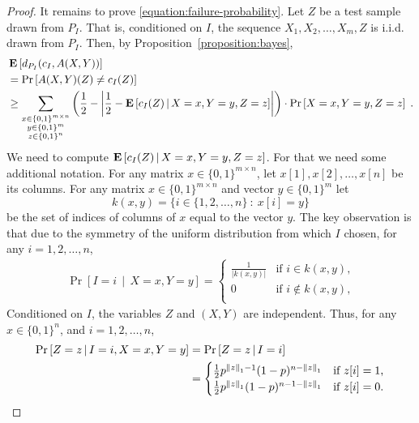 \begin{proof}
It remains to prove \eqref{equation:failure-probability}.
Let $Z$ be a test sample drawn from $P_I$. That is, conditioned on $I$, the sequence $X_1, X_2, \dots, X_m, Z$ is i.i.d. drawn from $P_I$.
Then, by Proposition~\ref{proposition:bayes},
\begin{align}
& \operatorname{\mathbf{E}} \left[d_{P_I}(c_I, A(X,Y))\right] \notag \\
& = \Pr\left[ A(X,Y)(Z) \neq c_I(Z) \right] \notag \\
& \ge \sum_{\substack{x \in \{0,1\}^{m \times n} \\ y \in \{0,1\}^m \\ z \in \{0,1\}^n}} \left( \frac{1}{2} - \left| \frac{1}{2} - \operatorname{\mathbf{E}}\left[ c_I(Z) \, \middle| \, X = x, Y = y, Z = z \right] \right| \right) \cdot \Pr \left[X = x, Y = y, Z = z \right] \label{equation:expected-error-lower-bound} \; .
\end{align}
We need to compute $\operatorname{\mathbf{E}}\left[ c_I(Z) \, \middle| \, X = x, Y = y, Z = z \right]$.
For that we need some additional notation.
For any matrix $x \in \{0,1\}^{m \times n}$, let $x[1], x[2], \dots, x[n]$ be its columns.
For any matrix $x \in \{0,1\}^{m \times n}$ and vector $y \in \{0,1\}^m$ let
$$
k(x,y) = \{ i \in \{1,2,\dots,n\} ~:~ x[i] = y \}
$$
be the set of indices of columns of $x$ equal to the vector $y$. The key
observation is that due to the symmetry of the uniform distribution from which
$I$ chosen, for any $i = 1,2,\dots,n$,
\begin{align*}
\Pr \left[I = i \, \middle| \, X = x, Y = y \right]
=
\begin{cases}
\frac{1}{|k(x,y)|} & \text{if $i \in k(x,y)$,} \\
0 & \text{if $i \not \in k(x,y)$,} \\
\end{cases}
\end{align*}
Conditioned on $I$, the variables $Z$ and $(X,Y)$ are independent. Thus,
for any $x \in \{0,1\}^n$, and $i = 1,2,\dots,n$,
\begin{align*}
\Pr \left[Z = z \, \middle| \, I = i, X = x, Y = y \right]
& = \Pr \left[Z = z \, \middle| \, I = i \right] \\
& =
\begin{cases}
\frac{1}{2} p^{\left\| z \right\|_1 - 1} (1 - p)^{n - \left\| z \right\|_1} & \text{if $z[i] = 1$,} \\
\frac{1}{2} p^{\left\| z \right\|_1} (1-p)^{n-1 - \left\| z \right\|_1}& \text{if $z[i] = 0$.} \\
\end{cases}
\end{align*}

\end{proof}
